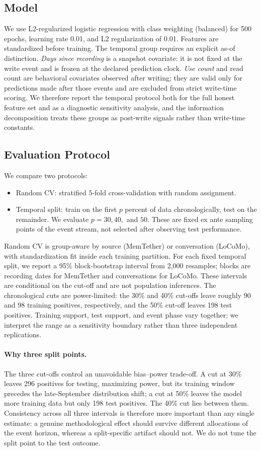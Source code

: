 \documentclass[sigconf,nonacm]{acmart}
\begin{document}
\subsection{Model}
We use L2-regularized logistic regression with class weighting (balanced) for 500 epochs, learning rate 0.01, and L2 regularization of 0.01. Features are standardized before training. The temporal group requires an explicit as-of distinction. \emph{Days since recording} is a snapshot covariate: it is not fixed at the write event and is frozen at the declared prediction clock. \emph{Use count} and read count are behavioral covariates observed after writing; they are valid only for predictions made after those events and are excluded from strict write-time scoring. We therefore report the temporal protocol both for the full honest feature set and as a diagnostic sensitivity analysis, and the information decomposition treats these groups as post-write signals rather than write-time constants.

\subsection{Evaluation Protocol}
We compare two protocols:
\begin{itemize}
\item Random CV: stratified 5-fold cross-validation with random assignment.
\item Temporal split: train on the first $p$ percent of data chronologically, test on the remainder. We evaluate $p = 30, 40,$ and $50$. These are fixed ex ante sampling points of the event stream, not selected after observing test performance.
\end{itemize}
Random CV is group-aware by source (MemTether) or conversation (LoCoMo), with standardization fit inside each training partition. For each fixed temporal split, we report a 95\% block-bootstrap interval from 2,000 resamples; blocks are recording dates for MemTether and conversations for LoCoMo. These intervals are conditional on the cut-off and are not population inferences. The chronological cuts are power-limited: the 30\% and 40\% cut-offs leave roughly 90 and 98 training positives, respectively, and the 50\% cut-off leaves 198 test positives. Training support, test support, and event phase vary together; we interpret the range as a sensitivity boundary rather than three independent replications.

\paragraph{Why three split points.}
The three cut-offs control an unavoidable bias--power trade-off. A cut at 30\% leaves 296 positives for testing, maximizing power, but its training window precedes the late-September distribution shift; a cut at 50\% leaves the model more training data but only 198 test positives. The 40\% cut lies between them. Consistency across all three intervals is therefore more important than any single estimate: a genuine methodological effect should survive different allocations of the event horizon, whereas a split-specific artifact should not. We do not tune the split point to the test outcome.
\end{document}
